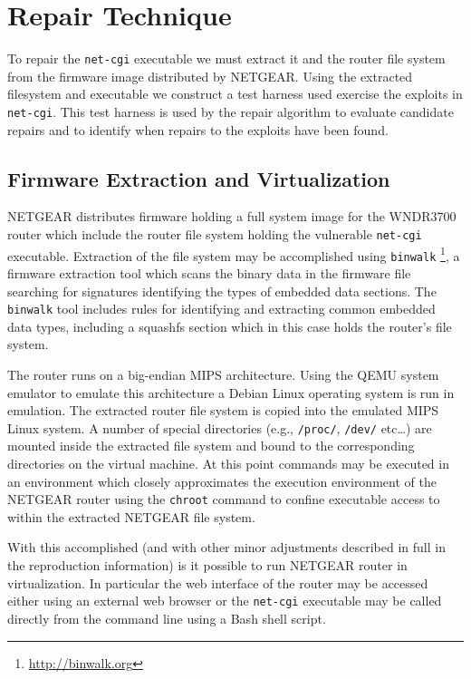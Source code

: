 \documentclass{sigcomm-alternate}
\begin{document}
\section{Repair Technique}
\label{sec-3}
To repair the \texttt{net-cgi} executable we must extract it and the router
file system from the firmware image distributed by NETGEAR.  Using the
extracted filesystem and executable we construct a test harness used
exercise the exploits in \texttt{net-cgi}.  This test harness is used by the
repair algorithm to evaluate candidate repairs and to identify when
repairs to the exploits have been found.

\subsection{Firmware Extraction and Virtualization}
\label{sec-3-1}
NETGEAR distributes firmware holding a full system image for the
WNDR3700 router which include the router file system holding the
vulnerable \texttt{net-cgi} executable.  Extraction of the file system may be
accomplished using \texttt{binwalk} \footnote{\url{http://binwalk.org}}, a firmware extraction tool which
scans the binary data in the firmware file searching for signatures
identifying the types of embedded data sections.  The \texttt{binwalk} tool
includes rules for identifying and extracting common embedded data
types, including a squashfs \cite{lougher2006squashfs} section which in
this case holds the router's file system.

The router runs on a big-endian MIPS architecture.  Using the QEMU
\cite{bellard2005qemu} system emulator to emulate this architecture a
Debian Linux operating system is run in emulation.  The extracted
router file system is copied into the emulated MIPS Linux system.  A
number of special directories (e.g., \texttt{/proc/}, \texttt{/dev/} etc\ldots{}) are
mounted inside the extracted file system and bound to the
corresponding directories on the virtual machine.  At this point
commands may be executed in an environment which closely approximates
the execution environment of the NETGEAR router using the \texttt{chroot}
command to confine executable access to within the extracted NETGEAR
file system.

With this accomplished (and with other minor adjustments described in
full in the reproduction information) is it possible to run NETGEAR
router in virtualization.  In particular the web interface of the
router may be accessed either using an external web browser or the
\texttt{net-cgi} executable may be called directly from the command
line using a Bash shell script.
\end{document}
